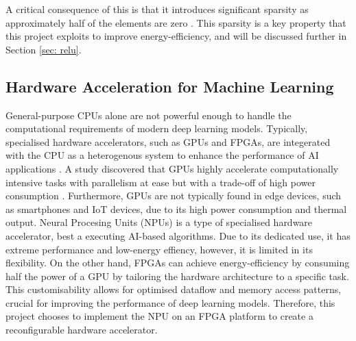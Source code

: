 \documentclass[12pt, a4paper, ukenglish]{article}
\begin{document}
     A critical consequence of this is that it introduces significant sparsity as approximately half of the elements are zero \cite{sun_sense_2023}. This sparsity is a key property that this project exploits to improve energy-efficiency, and will be discussed further in Section \ref{sec: relu}. 
    
    

    \subsection{Hardware Acceleration for Machine Learning} \label{sec: hardware accel}
    General-purpose CPUs alone are not powerful enough to handle the computational requirements of modern deep learning models. Typically, specialised hardware accelerators, such as GPUs and FPGAs, are integerated with the CPU as a heterogenous system  to enhance the performance of AI applications \cite{manor_custom_2022}. A study discovered that GPUs highly accelerate computationally intensive tasks with parallelism at ease but with a trade-off of high power consumption \cite{oh_investigation_2017}. Furthermore, GPUs are not typically found in edge devices, such as smartphones and IoT devices, due to its high power consumption and thermal output. Neural Procesing Units (NPUs) is a type of specialised hardware accelerator, best a executing AI-based algorithms. Due to its dedicated use, it has extreme performance and low-energy effiency, however, it is limited in its flexibility. On the other hand, FPGAs can achieve energy-efficiency by consuming half the power of a GPU\cite{liu_energy-efficient_2024} by tailoring the hardware architecture to a specific task. This customisability allows for optimised dataflow and memory access patterns, crucial for improving the performance of deep learning models. Therefore, this project chooses to implement the NPU on an FPGA platform to create a reconfigurable hardware accelerator. 

\end{document}
